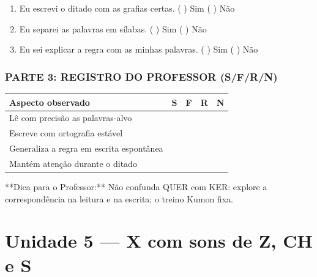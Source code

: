 \begin{exercicio}
\begin{enumerate}[label=\alph*)]
  \item Eu escrevi o ditado com as grafias certas.  \quad ( ) Sim   ( ) Não

  \item Eu separei as palavras em sílabas.  \quad ( ) Sim   ( ) Não

  \item Eu sei explicar a regra com as minhas palavras.  \quad ( ) Sim   ( ) Não

\end{enumerate}

\subsection*{PARTE 3: REGISTRO DO PROFESSOR (S/F/R/N)}

\begin{center}
\renewcommand{\arraystretch}{1.4}
\begin{tabular}{@{}p{9cm}cccc@{}}
\toprule
Aspecto observado & S & F & R & N \\
\midrule
Lê com precisão as palavras-alvo & & & & \\
Escreve com ortografia estável & & & & \\
Generaliza a regra em escrita espontânea & & & & \\
Mantém atenção durante o ditado & & & & \\
\bottomrule\end{tabular}\end{center}

\end{exercicio}

\begin{dica}
**Dica para o Professor:** Não confunda QUER com KER: explore a correspondência na leitura e na escrita; o treino Kumon fixa.
\end{dica}


\chapter{Unidade 5 --- X com sons de Z, CH e S}



